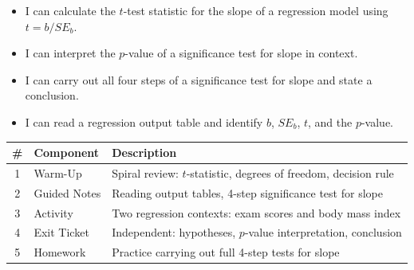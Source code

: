 \documentclass[10pt]{article}
\begin{document}

\vspace{2.4cm}
\namedateperiod

\begin{learningtargetbox}
\begin{itemize}
    \item I can calculate the $t$-test statistic for the slope of a regression model
          using $t = b / SE_b$.
    \item I can interpret the $p$-value of a significance test for slope in context.
    \item I can carry out all four steps of a significance test for slope and state
          a conclusion.
    \item I can read a regression output table and identify $b$, $SE_b$, $t$, and
          the $p$-value.
\end{itemize}
\end{learningtargetbox}

\begin{tocbox}
\renewcommand{\arraystretch}{1.5}
\begin{tabularx}{\linewidth}{clX}
    \textbf{\#} & \textbf{Component} & \textbf{Description} \\
    \hline
    1 & Warm-Up      & Spiral review: $t$-statistic, degrees of freedom, decision rule \\
    2 & Guided Notes & Reading output tables, 4-step significance test for slope \\
    3 & Activity     & Two regression contexts: exam scores and body mass index \\
    4 & Exit Ticket  & Independent: hypotheses, $p$-value interpretation, conclusion \\
    5 & Homework     & Practice carrying out full 4-step tests for slope \\
\end{tabularx}
\end{tocbox}
\end{document}
